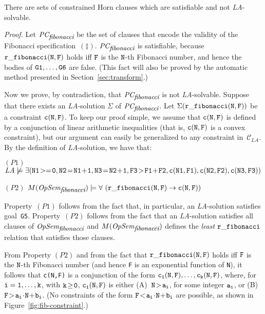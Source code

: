 \documentclass[english]{tlp}
\begin{document}
\vspace{-1mm}
\begin{theorem}\label{thm:limitation}
	There are sets of 
	constrained Horn clauses which are satisfiable and not \mbox{{\textit {LA}}-solvable}.\end{theorem}

\vspace{-2mm}
\noindent
{\it Proof.}
Let $\textit{PC}_{{\textit{\small fibonacci}}}$ be the
set of clauses that encode the validity of the Fibonacci 
specification~$(\ddagger)$.
$\textit{PC}_{\textit{\small fibonacci}}$ is satisfiable, because
${\tt r\_fibonacci(N,F)}$ holds iff ${\tt F}$ is the
${\tt N}$-th Fibonacci number, and hence the bodies of 
${\tt G1}, \ldots, {\tt G6}$ are false.
(This fact will also be proved by the automatic method presented in 
Section~\ref{sec:transform}.)

Now we prove, by contradiction, that 
$\textit{PC}_{\textit{\small fibonacci}}$ is not {\textit {LA}}-solvable.
Suppose that there exists an {\textit {LA}}-solution $\Sigma$ 
of $\textit{PC}_{{\textit{\small fibonacci}}}$.
Let $\Sigma ({\tt r\_fibonacci(N,F)})$ be a constraint ${\tt c(N,F)}$.
To keep our proof simple, we assume that ${\tt c(N,F)}$ is defined by a 
conjunction of linear arithmetic inequalities (that is, ${\tt c(N,F)}$ 
is a convex constraint), 
but our argument can easily be generalized to any constraint in~$\mathcal C_{{LA}}$.
By the definition of {\textit {LA}}-solution, we have that:



{\small{
\noindent
$(P1)$ {{${\textit{LA}} \not\models \exists({\tt N1\!>=\!0, 
N2\!=\!N1\!+\!1, N3\!=\!N2\!+\!1, F3\!>\!F1\!+\!F2, c(N1,F1), 
c(N2,F2), c(N3,F3)})$}} 
		
\noindent
$(P2)$ {{$M(\textit{OpSem}_{\textit{\small fibonacci}}) \models 
\forall\ ( {\tt r\_fibonacci(N,F) \rightarrow  c(N,F)})$}} }}
	
\noindent
Property~$(P1)$ follows from the fact that, in particular, an 
\textit{LA}-solution satisfies goal~{\tt G5}.
Property~$(P2)$ follows from the fact that an \textit{LA}-solution 
satisfies all clauses of 
$\textit{OpSem}_{\textit{\small fibonacci}}$ and
$M(\textit{OpSem}_{\textit{\small fibonacci}})$ defines the 
{\it least\/} ${\tt r\_fibonacci}$ relation that satisfies 
those clauses.

From Property $(P2)$ and from the fact that ${\tt r\_fibonacci(N,F)}$ 
holds iff ${\tt F}$ is the
${\tt N}$-th Fibonacci number (and hence {\tt F} is an exponential 
function of {\tt N}), 
it follows that {\tt c(N,F)} is a conjunction of the form 
${\tt c_1(N,F), \ldots,  c_k(N,F)}$,
where, for ${\tt i=1,\ldots,k}$, with ${\tt k\!\geq\!0}$, ${\tt c_i(N,F)}$ is
either 
(A)~${\tt N\! >\! a_i}$, for some integer ${\tt a_i}$, or 
(B)~${\tt F\! >\! a_i\! \cdot\! N\! +\! b_i}$. 
(No constraints of the form ${\tt F\! <\! a_i\! \cdot\! N\! +\! b_i}$
are possible, as shown in Figure~\ref{fig:fib-constraint}.)
\end{document}
